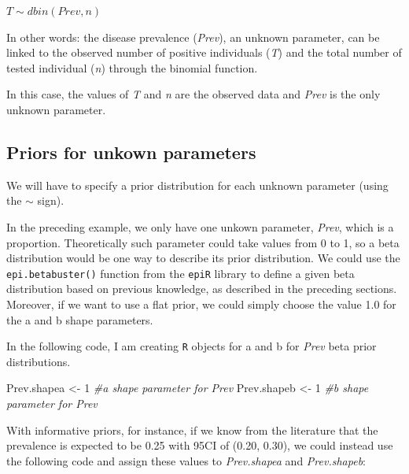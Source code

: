 \documentclass[
]{book}
\newenvironment{Shaded}{\begin{snugshade}}{\end{snugshade}}
\newcommand{\CommentTok}[1]{\textcolor[rgb]{0.56,0.35,0.01}{\textit{#1}}}
\newcommand{\DecValTok}[1]{\textcolor[rgb]{0.00,0.00,0.81}{#1}}
\newcommand{\NormalTok}[1]{#1}
\newcommand{\OtherTok}[1]{\textcolor[rgb]{0.56,0.35,0.01}{#1}}
\begin{document}
\(T \sim dbin(Prev, n)\)

In other words: the disease prevalence (\emph{Prev}), an unknown
parameter, can be linked to the observed number of positive individuals
(\emph{T}) and the total number of tested individual (\emph{n}) through
the binomial function.

In this case, the values of \emph{T} and \emph{n} are the observed data
and \emph{Prev} is the only unknown parameter.

\hypertarget{priors-for-unkown-parameters}{%
\subsection{Priors for unkown
parameters}\label{priors-for-unkown-parameters}}

We will have to specify a prior distribution for each unknown parameter
(using the \(\sim\) sign).

In the preceding example, we only have one unkown parameter,
\emph{Prev}, which is a proportion. Theoretically such parameter could
take values from 0 to 1, so a beta distribution would be one way to
describe its prior distribution. We could use the
\texttt{epi.betabuster()} function from the \texttt{epiR} library to
define a given beta distribution based on previous knowledge, as
described in the preceding sections. Moreover, if we want to use a flat
prior, we could simply choose the value 1.0 for the a and b shape
parameters.

In the following code, I am creating \texttt{R} objects for a and b for
\emph{Prev} beta prior distributions.

\begin{Shaded}
\begin{Highlighting}[]
\NormalTok{Prev.shapea }\OtherTok{\textless{}{-}} \DecValTok{1}         \CommentTok{\#a shape parameter for Prev    }
\NormalTok{Prev.shapeb }\OtherTok{\textless{}{-}} \DecValTok{1}         \CommentTok{\#b shape parameter for Prev }
\end{Highlighting}
\end{Shaded}

With informative priors, for instance, if we know from the literature
that the prevalence is expected to be 0.25 with 95CI of (0.20, 0.30), we
could instead use the following code and assign these values to
\emph{Prev.shapea} and \emph{Prev.shapeb}:
\end{document}
